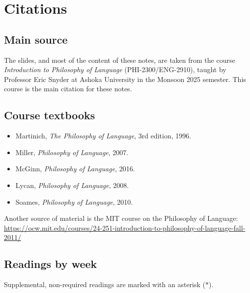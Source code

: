 \chapter*{Citations}

\section*{Main source}

The slides, and most of the content of these notes, are taken from the course \emph{Introduction to Philosophy of Language} (PHI-2300/ENG-2910), taught by Professor Eric Snyder at Ashoka University in the Monsoon 2025 semester. This course is the main citation for these notes. 

\section*{Course textbooks}

\begin{itemize}
  \item Martinich, \emph{The Philosophy of Language}, 3rd edition, 1996.
  \item Miller, \emph{Philosophy of Language}, 2007.
  \item McGinn, \emph{Philosophy of Language}, 2016.
  \item Lycan, \emph{Philosophy of Language}, 2008.
  \item Soames, \emph{Philosophy of Language}, 2010.
\end{itemize}

Another source of material is the MIT course on the Philosophy of Language:\\
\url{https://ocw.mit.edu/courses/24-251-introduction-to-philosophy-of-language-fall-2011/}

\section*{Readings by week}

Supplemental, non-required readings are marked with an asterisk ($\ast$).

\newcommand{\req}{\item[--]}
\newcommand{\supp}{\item[$\ast$]}
\newenvironment{readings}{\begin{itemize}[leftmargin=2em,itemsep=0pt]}{\end{itemize}}

